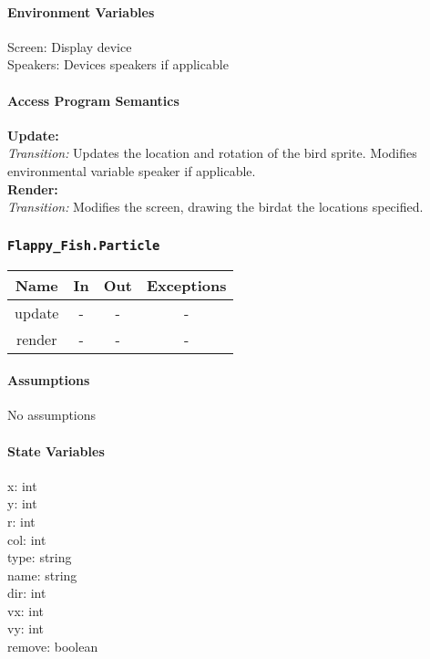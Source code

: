 \documentclass[11pt, oneside]{article}   	%
\begin{document}
\paragraph{Environment Variables}
Screen: Display device\\
Speakers: Devices speakers if applicable\\


\paragraph{Access Program Semantics} 
 \textbf{Update:}  \\
 \textit{Transition:} Updates the location and rotation of the bird sprite. Modifies environmental variable speaker if applicable.\\
 \textbf{Render:}  \\
 \textit{Transition:} Modifies the screen, drawing the birdat the locations specified.\\

\subsubsection{\texttt{Flappy\_Fish.Particle}}



\begin{center}
\begin{tabular}{ |c|c|c|c| } 
 \hline
 Name & In & Out & Exceptions \\ 
 \hline \hline
 update & - & - & - \\ 
render &  -& - & - \\ 
 \hline
\end{tabular}
\end{center}

\paragraph{Assumptions}
No assumptions

\paragraph{State Variables}
x: int\\
y: int\\
r: int \\
col: int \\
type: string\\
name: string \\
dir: int\\
vx: int \\
vy: int \\
remove: boolean \\
\end{document}
